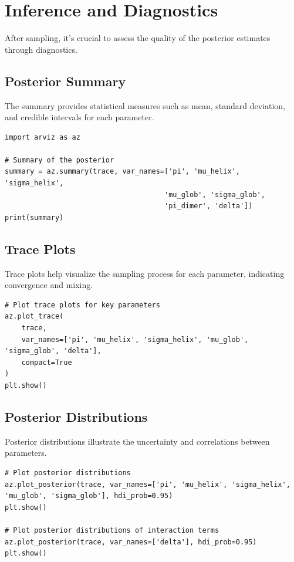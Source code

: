 \documentclass[12pt]{article}
\begin{document}
\section{Inference and Diagnostics}

After sampling, it's crucial to assess the quality of the posterior estimates through diagnostics.

\subsection{Posterior Summary}
The summary provides statistical measures such as mean, standard deviation, and credible intervals for each parameter.

\begin{verbatim}
import arviz as az

# Summary of the posterior
summary = az.summary(trace, var_names=['pi', 'mu_helix', 'sigma_helix', 
                                      'mu_glob', 'sigma_glob', 
                                      'pi_dimer', 'delta'])
print(summary)
\end{verbatim}

\subsection{Trace Plots}
Trace plots help visualize the sampling process for each parameter, indicating convergence and mixing.

\begin{verbatim}
# Plot trace plots for key parameters
az.plot_trace(
    trace,
    var_names=['pi', 'mu_helix', 'sigma_helix', 'mu_glob', 'sigma_glob', 'delta'],
    compact=True
)
plt.show()
\end{verbatim}

\subsection{Posterior Distributions}
Posterior distributions illustrate the uncertainty and correlations between parameters.

\begin{verbatim}
# Plot posterior distributions
az.plot_posterior(trace, var_names=['pi', 'mu_helix', 'sigma_helix', 'mu_glob', 'sigma_glob'], hdi_prob=0.95)
plt.show()

# Plot posterior distributions of interaction terms
az.plot_posterior(trace, var_names=['delta'], hdi_prob=0.95)
plt.show()
\end{verbatim}
\end{document}
